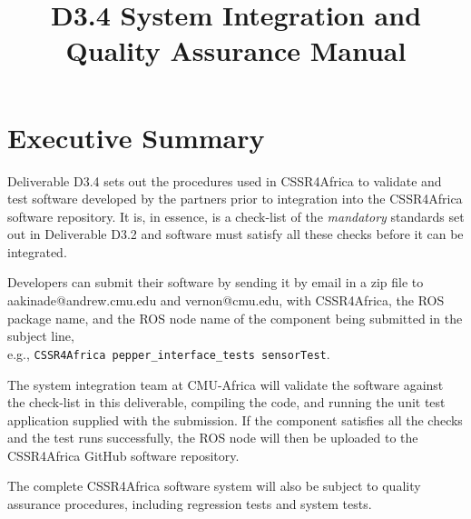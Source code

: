 \documentclass{CSSRforAfrica}
\begin{document}



\title{D3.4 System Integration and Quality Assurance Manual}

\partner{}                          




\maketitle
 

\section*{Executive Summary}
\label{executive_summary}
 
Deliverable D3.4 sets out the procedures used in CSSR4Africa to validate and test software developed by the partners prior to integration into the CSSR4Africa  software repository.   It is, in essence,  is a check-list of the {\em mandatory}  standards set out in Deliverable D3.2 and software must satisfy all these checks before it can be integrated.  

Developers can submit their software by sending it by email in a zip file to aakinade@andrew.cmu.edu and vernon@cmu.edu, with CSSR4Africa, the ROS package name, and the ROS node name of the component being submitted in the subject line,\\ e.g., {\small \verb+CSSR4Africa pepper_interface_tests sensorTest+}.

The system integration team at CMU-Africa will validate the software against the check-list in this deliverable, compiling the code, and running the unit test application supplied with the submission.  If the component satisfies all the checks and the test runs successfully, the ROS node will then be uploaded to the CSSR4Africa GitHub software repository.

The complete CSSR4Africa  software system will also be subject to quality assurance procedures, including regression tests and system tests.  
\end{document}
